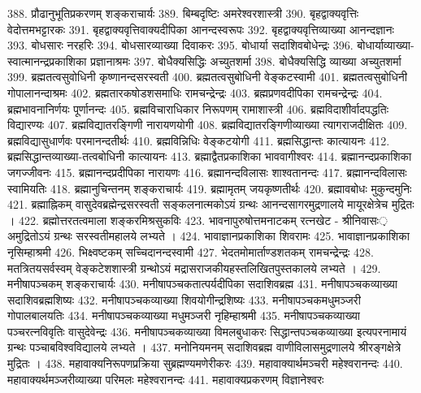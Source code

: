 388. प्रौढानुभूतिप्रकरणम् 				शङ्कराचार्यः
389. बिम्बदृष्टिः							अमरेश्वरशास्त्री
390. बृहद्वाक्यवृत्तिः						वेदोत्तमभट्टारकः
391. बृहद्वाक्यवृत्तिवाक्यदीपिका		आनन्दस्वरूपः
392. बृहद्वाक्यवृत्तिव्याख्या				आनन्दज्ञानः
393.	बोधसारः							नरहरिः
394. बोधसारव्याख्या					दिवाकरः
395. बोधार्या							सदाशिवबोधेन्द्रः
396. बोधार्याव्याख्या-स्वात्मानन्द्रप्रकाशिका 	प्रज्ञानाश्रमः
397. बोधैक्यसिद्धिः						अच्युतशर्मा
398. बोधैक्यसिद्धि व्याख्या				अच्युतशर्मा
399. ब्रह्मतत्वसुवोधिनी					कृष्णानन्दसरस्वती
400. ब्रह्मतत्वसुबोधिनी					वेङ्कटस्वामी	
401. ब्रह्मतत्वसुबोधिनी					गोपालानन्दाश्रमः
402. ब्रह्मतारकषोडशसमाधिः			रामचन्द्रेन्द्रः
403. ब्रह्मप्रणवदीपिका					रामचन्द्रेन्द्रः
404. ब्रह्मभावनानिर्णयः 					पूर्णानन्दः
405. ब्रह्मविचाराधिकार निरूपणम्		रामाशास्त्री
406. ब्रह्मविदाशीर्वादपद्धतिः				विद्यारण्यः
407. ब्रह्मविद्यातरङ्गिणी					नारायणयोगी
408. ब्रह्मविद्यातरङ्गिणीव्याख्या			त्यागराजदीक्षितः 
409. ब्रह्मविद्यासुधार्णवः					परमानन्दतीर्थः
410. ब्रह्मविन्निधिः						वेङ्कटयोगी
411. ब्रह्मसिद्धान्तः						कात्यायनः
412. ब्रह्मसिद्धान्तव्याख्या-तत्वबोधिनी	 कात्यायनः
413. ब्रह्माद्वैतप्रकाशिका					भाववागीश्वरः
414. ब्रह्मानन्दप्रकाशिका				जगज्जीवनः
415. ब्रह्मानन्दप्रदीपिका					नारायणः
416. ब्रह्मानन्दविलासः					शाश्वतानन्दः
417. ब्रह्मानन्दविलासः					स्वामियतिः
418. ब्रह्मानुचिन्तनम् 					शङ्कराचार्यः
419. ब्रह्मामृतम्							जयकृष्णतीर्थः
420. ब्रह्मावबोधः						मुकुन्दमुनिः
421. ब्रह्माह्निकम् 						वासुदेवब्रह्मेन्द्रसरस्वती
		सङ्कलनात्मकोऽयं ग्रन्थः आनन्दसागरमुद्रणालये मायूरक्षेत्रेच मुद्रितः ।
422. ब्रह्मोत्तरतत्वमाला					शङ्करमिश्रसुकविः
423. भावनापुरुषोत्तमनाटकम् 			रत्नखेट - श्रीनिवासः़
		अमुद्रितोऽयं ग्रन्थः सरस्वतीमहालये लभ्यते ।
424. भावाज्ञानप्रकाशिका				शिवरामः
425. भावाज्ञानप्रकाशिका				नृसिम्हाश्रमी
426. भिक्ष्वष्टकम् 						सच्चिदानन्दस्वामी
427. भेदतमोमार्ताण्डशतकम् 			रामचन्द्रेन्द्रः
428. मतत्रितयसर्वस्वम् 				वेङ्कटेशशास्त्री
		ग्रन्थोऽयं मद्रासराजकीयहस्तलिखितपुस्तकालये लभ्यते ।
429. मनीषापञ्चकम् 					शङ्कराचार्यः 
430. मनीषापञ्चकतात्पर्यदीपिका 		सदाशिवब्रह्म
431. मनीषापञ्चकव्याख्या				सदाशिवब्रह्मशिष्यः
432. मनीषापञ्चकव्याख्या 				शिवयोगीन्द्रशिष्यः
433. मनीषापञ्चकमधुमञ्जरी 			गोपालबालयतिः
434. मनीषापञ्चकव्याख्या मधुमञ्जरी	नृहिम्हाश्रमी
435. मनीषापञ्चकव्याख्या पञ्चरत्नविवृतिः वासुदेवेन्द्रः
436. मनीषापञ्चकव्याख्या				विमलबुधाकरः
		सिद्धान्तपञ्चकव्याख्या इत्यपरनामायं ग्रन्थः पञ्चाबविश्वविद्यालये लभ्यते । 
437. मनोनियमनम् 						सदाशिवब्रह्म
		वाणीविलासमुद्रणालये श्रीरङ्गक्षेत्रे मुद्रितः ।
438. महावाक्यनिरूपणप्रक्रिया			सुब्रह्मण्यमणेरीकरः
439. महावाक्यार्थमञ्चरी 				महेश्वरानन्दः
440. महावाक्यर्थमञ्जरीव्याख्या परिमलः महेश्वरानन्दः
441. महावाक्यप्रकरणम् 				विज्ञानेश्वरः
